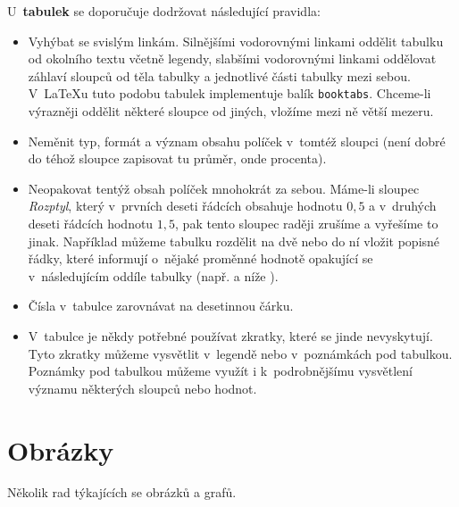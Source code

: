 U~\textbf{tabulek} se doporučuje dodržovat následující pravidla:

\begin{itemize} %
\item Vyhýbat se svislým linkám. Silnějšími vodorovnými linkami
  oddělit tabulku od okolního textu včetně legendy, slabšími
  vodorovnými linkami oddělovat záhlaví sloupců od těla tabulky a
  jednotlivé části tabulky mezi sebou. V~\LaTeX u tuto podobu tabulek
  implementuje balík \texttt{booktabs}. Chceme-li výrazněji oddělit
  některé sloupce od jiných, vložíme mezi ně větší mezeru.
\item Neměnit typ, formát a význam obsahu políček v~tomtéž sloupci
  (není dobré do téhož sloupce zapisovat tu průměr, onde procenta).
\item Neopakovat tentýž obsah políček mnohokrát za sebou. Máme-li
  sloupec \textit{Rozptyl}, který v~prvních deseti řádcích obsahuje
  hodnotu $0,5$ a v~druhých deseti řádcích hodnotu $1,5$, pak tento
  sloupec raději zrušíme a vyřešíme to jinak. Například můžeme tabulku
  rozdělit na dvě nebo do ní vložit popisné řádky, které informují
o~nějaké proměnné hodnotě opakující se v~následujícím oddíle tabulky
  (např. \emph{} a níže \emph{}).
\item Čísla v~tabulce zarovnávat na desetinnou čárku.
\item V~tabulce je někdy potřebné používat zkratky, které se jinde
nevyskytují. Tyto zkratky můžeme vysvětlit v~legendě nebo
v~poznámkách pod tabulkou. Poznámky pod tabulkou můžeme využít i
k~podrobnějšímu vysvětlení významu  některých sloupců nebo hodnot.
\end{itemize}

\section{Obrázky}

Několik rad týkajících se obrázků a grafů.

